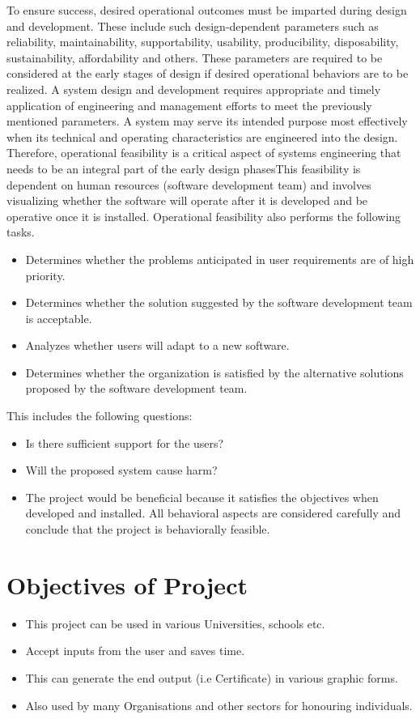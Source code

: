 To ensure success, desired operational outcomes must be imparted during design and development. These include such design-dependent parameters such as reliability, maintainability, supportability, usability, producibility, disposability, sustainability, affordability and others. These parameters are required to be considered at the early stages of design if desired operational behaviors are to be realized. A system design and development requires appropriate and timely application of engineering and management efforts to meet the previously mentioned parameters. A system may serve its intended purpose most effectively when its technical and operating characteristics are engineered into the design. Therefore, operational feasibility is a critical aspect of systems engineering that needs to be an integral part of the early design phasesThis feasibility is dependent on human resources (software development team) and involves visualizing whether the software will operate after it is developed and be operative once it is installed. Operational feasibility also performs the following tasks.

\begin{itemize}
	\item Determines whether the problems anticipated in user requirements are of high priority.
	\item Determines whether the solution suggested by the software development team is acceptable.
	\item Analyzes whether users will adapt to a new software.
	\item Determines whether the organization is satisfied by the alternative solutions proposed by the software development team.
\end{itemize}

This includes the following questions:
\begin{itemize}
	\item Is there sufficient support for the users?
	\item Will the proposed system cause harm?
	\item The project would be beneficial because it satisfies the objectives when developed and installed. All behavioral aspects are considered carefully and conclude that the project is behaviorally feasible.
\end{itemize}

\section{Objectives of Project}
\begin{itemize}
\item This project can be used in various Universities, schools etc. 
\item Accept inputs from the user and saves time.
\item This can generate the end output (i.e Certificate) in various graphic forms.
\item Also used by many Organisations and other sectors for honouring individuals.
\end{itemize}




